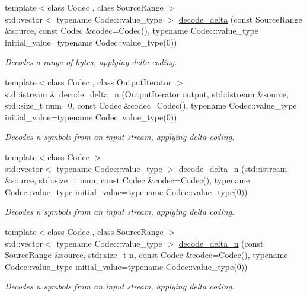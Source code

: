 \begin{DoxyCompactItemize}
{\footnotesize template$<$class Codec , class Source\+Range $>$ }\\std\+::vector$<$ typename Codec\+::value\+\_\+type $>$ \mbox{\hyperlink{namespaceirk_1_1coding_afa46e8e12454722bbfd86e0f9dbfbfd8}{decode\+\_\+delta}} (const Source\+Range \&source, const Codec \&codec=Codec(), typename Codec\+::value\+\_\+type initial\+\_\+value=typename Codec\+::value\+\_\+type(0))
\begin{DoxyCompactList}\small\item\em Decodes a range of bytes, applying delta coding. \end{DoxyCompactList}\item 
{\footnotesize template$<$class Codec , class Output\+Iterator $>$ }\\std\+::istream \& \mbox{\hyperlink{namespaceirk_1_1coding_a8ed42826b36ba86d9707eac7c8b42dbc}{decode\+\_\+delta\+\_\+n}} (Output\+Iterator output, std\+::istream \&source, std\+::size\+\_\+t num=0, const Codec \&codec=Codec(), typename Codec\+::value\+\_\+type initial\+\_\+value=typename Codec\+::value\+\_\+type(0))
\begin{DoxyCompactList}\small\item\em Decodes {\ttfamily n} symbols from an input stream, applying delta coding. \end{DoxyCompactList}\item 
{\footnotesize template$<$class Codec $>$ }\\std\+::vector$<$ typename Codec\+::value\+\_\+type $>$ \mbox{\hyperlink{namespaceirk_1_1coding_a067a41d448d494c7384717fa369b7493}{decode\+\_\+delta\+\_\+n}} (std\+::istream \&source, std\+::size\+\_\+t num, const Codec \&codec=Codec(), typename Codec\+::value\+\_\+type initial\+\_\+value=typename Codec\+::value\+\_\+type(0))
\begin{DoxyCompactList}\small\item\em Decodes {\ttfamily n} symbols from an input stream, applying delta coding. \end{DoxyCompactList}\item 
{\footnotesize template$<$class Codec , class Source\+Range $>$ }\\std\+::vector$<$ typename Codec\+::value\+\_\+type $>$ \mbox{\hyperlink{namespaceirk_1_1coding_aeea4bf2688a5aec5abe8ddaa05d0b4b0}{decode\+\_\+delta\+\_\+n}} (const Source\+Range \&source, std\+::size\+\_\+t n, const Codec \&codec=Codec(), typename Codec\+::value\+\_\+type initial\+\_\+value=typename Codec\+::value\+\_\+type(0))
\begin{DoxyCompactList}\small\item\em Decodes {\ttfamily n} symbols from an input stream, applying delta coding. \end{DoxyCompactList}\end{DoxyCompactItemize}


